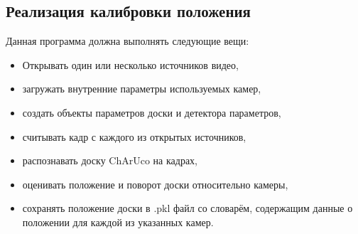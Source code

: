 \documentclass[14pt, a4paper]{extarticle}
\begin{document}
\subsection{Реализация калибровки положения}
Данная программа должна выполнять следующие вещи:
\begin{itemize}
  \item Открывать один или несколько источников видео,
  \item загружать внутренние параметры используемых камер,
  \item создать объекты параметров доски и детектора параметров,
  \item считывать кадр с каждого из открытых источников,
  \item распознавать доску ChArUco на кадрах,
  \item оценивать положение и поворот доски относительно камеры,
  \item сохранять положение доски в .pkl файл со словарём, содержащим данные о
    положении для каждой из указанных камер.
\end{itemize}
\end{document}
